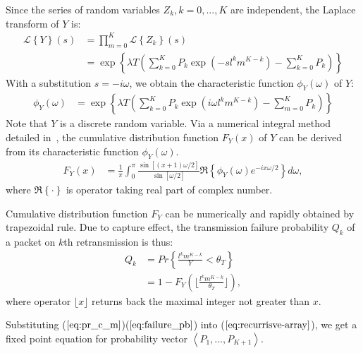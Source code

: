 Since the series of random variables $Z_k, k=0,..., K$ are independent, the Laplace transform of $Y$ is:
\begin{align*}
\mathcal{L} \left\lbrace Y \right\rbrace \left( s \right) 
&= \prod_{m=0}^{K}  \mathcal{L} \left\lbrace Z_k \right\rbrace \left( s \right) \\
&= \exp\left\lbrace \lambda T \left( \sum_{k=0}^{K} P_k \exp(-sl^k m^{K-k})-\sum_{k=0}^{K}P_k\right)\right\rbrace
\end{align*}
With a substitution $s= -i\omega$, we obtain the characteristic function $\phi_{Y}\left( \omega \right)$ of $Y$:
\begin{align*}
\phi_{Y}\left( \omega \right) &= \exp\left\lbrace \lambda T \left( \sum_{k=0}^{K} P_k \exp(i \omega l^k m^{K-k})-\sum_{m=0}^{K}P_k\right)\right\rbrace
\end{align*}
Note that $Y$ is a discrete random variable. Via a numerical integral method detailed in~\cite{nuttall1969numerical}, the cumulative distribution function $F_{Y}\left( x \right)$ of $Y$ can be derived from its characteristic function $\phi_{Y}\left( \omega \right)$.
\begin{align}
\label{eq:pr_c_m}
F_{Y}\left( x \right)  &= 	\frac{1}{\pi}\int_{0}^{\pi} \frac{\sin\left[ (x+1) \omega/2 \right] }{\sin\left[ \omega/2\right] } \Re\left\lbrace \phi_{Y}\left( \omega \right) e^{-ix\omega/2} \right\rbrace d\omega,
\end{align}
where $\Re\left\lbrace \cdot \right\rbrace$ is operator taking real part of complex number.

Cumulative distribution function $F_{Y}$ can be numerically and rapidly obtained by trapezoidal rule. Due to capture effect, the transmission failure probability $Q_k$ of a packet on $k$th retransmission is thus:
\begin{align}
\label{eq:failure_pb}
	Q_{k} &= Pr\left\lbrace \frac{l^k m^{K-k}}{Y} < \theta_{T}\right\rbrace \nonumber\\
	&= 1 - F_Y\left( \lfloor\frac{l^k m^{K-k}}{\theta_{T}}\rfloor \right),
\end{align}
where operator $\lfloor x \rfloor$ returns back the maximal integer not greater than $x$. 

Substituting ($\ref{eq:pr_c_m}$)($\ref{eq:failure_pb}$) into ($\ref{eq:recurrisve-array}$), we get a fixed point equation for probability vector $\left\langle P_1, ..., P_{K+1}\right\rangle$.  
